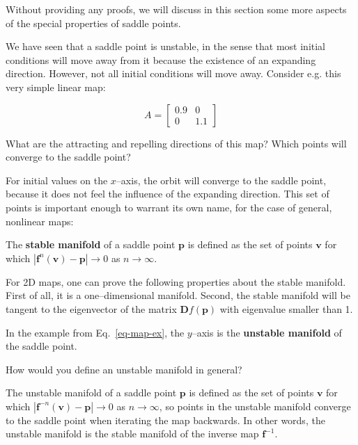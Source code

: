 Without providing any proofs, we will discuss in this section some more aspects of the special properties of saddle points.

We have seen that a saddle point is unstable, in the sense that most initial conditions will move away from it because the existence of an expanding direction. However, not all initial conditions will move away. Consider e.g. this very simple linear map:

\begin{equation}
A =
\begin{bmatrix}
0.9 & 0 \\
0 & 1.1
\end{bmatrix} 
\label{eq-map-ex}
\end{equation} 

\begin{cue}
What are the attracting and repelling directions of this map? Which points will converge to the saddle point? 
\end{cue}

For initial values on the $x$--axis, the orbit will converge to the saddle point, because it does not feel the influence of the expanding direction. This set of points is important enough to warrant its own name, for the case of general, nonlinear maps:

The \textbf{stable manifold} of a saddle point ${\mathbf p}$ is defined as the set of points ${\mathbf v}$ for which $|{\mathbf f}^n({\mathbf v}) - {\mathbf p} | \to 0$ as $ n \to \infty$.

\noindent{}For 2D maps, one can prove the following properties about the stable manifold. First of all, it is a one--dimensional manifold. Second, the stable manifold will be tangent to the eigenvector of the matrix ${\mathbf Df}({\mathbf p})$ with eigenvalue smaller than 1.

In the example from Eq.~\ref{eq-map-ex}, the $y$--axis is the \textbf{unstable manifold} of the saddle point.

\begin{cue}
How would you define an unstable manifold in general?  
\end{cue}

The unstable manifold of a saddle point ${\mathbf p}$ is defined as the set of points ${\mathbf v}$ for which $|{\mathbf f}^{-n}({\mathbf v}) - {\mathbf p}| \to 0$ as $ n \to \infty$, so points in the unstable manifold converge to the saddle point when iterating the map backwards. In other words, the unstable manifold is the stable manifold of the inverse map ${\mathbf f}^{-1}$.


